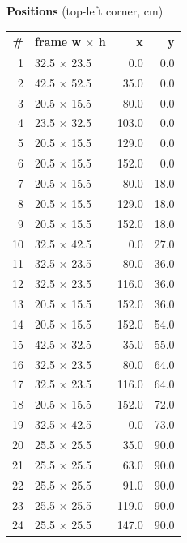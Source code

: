 \documentclass[a4paper,landscape,10pt]{article}
\begin{document}
\begin{minipage}[t]{0.25\textwidth}
\vspace{8pt}
{\bfseries Positions} (top-left corner, cm)\\[2pt]
\tiny
\begin{tabular}{@{}r l r r@{}}
\toprule
\# & frame w $\times$ h & x & y \\
\midrule
1 & 32.5 $\times$ 23.5 & 0.0 & 0.0 \\
2 & 42.5 $\times$ 52.5 & 35.0 & 0.0 \\
3 & 20.5 $\times$ 15.5 & 80.0 & 0.0 \\
4 & 23.5 $\times$ 32.5 & 103.0 & 0.0 \\
5 & 20.5 $\times$ 15.5 & 129.0 & 0.0 \\
6 & 20.5 $\times$ 15.5 & 152.0 & 0.0 \\
7 & 20.5 $\times$ 15.5 & 80.0 & 18.0 \\
8 & 20.5 $\times$ 15.5 & 129.0 & 18.0 \\
9 & 20.5 $\times$ 15.5 & 152.0 & 18.0 \\
10 & 32.5 $\times$ 42.5 & 0.0 & 27.0 \\
11 & 32.5 $\times$ 23.5 & 80.0 & 36.0 \\
12 & 32.5 $\times$ 23.5 & 116.0 & 36.0 \\
13 & 20.5 $\times$ 15.5 & 152.0 & 36.0 \\
14 & 20.5 $\times$ 15.5 & 152.0 & 54.0 \\
15 & 42.5 $\times$ 32.5 & 35.0 & 55.0 \\
16 & 32.5 $\times$ 23.5 & 80.0 & 64.0 \\
17 & 32.5 $\times$ 23.5 & 116.0 & 64.0 \\
18 & 20.5 $\times$ 15.5 & 152.0 & 72.0 \\
19 & 32.5 $\times$ 42.5 & 0.0 & 73.0 \\
20 & 25.5 $\times$ 25.5 & 35.0 & 90.0 \\
21 & 25.5 $\times$ 25.5 & 63.0 & 90.0 \\
22 & 25.5 $\times$ 25.5 & 91.0 & 90.0 \\
23 & 25.5 $\times$ 25.5 & 119.0 & 90.0 \\
24 & 25.5 $\times$ 25.5 & 147.0 & 90.0 \\
\bottomrule
\end{tabular}
\end{minipage}
\clearpage
\end{document}
